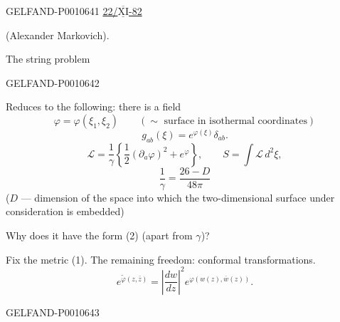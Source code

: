 \begin{GelfandAdjacentEvidence}{GELFAND-P001064}{1}
\underline{22/\(\overline{\underline{\mathrm{XI}}}\)-82 {}}\qquad
{}


(Alexander Markovich).

The string problem
\end{GelfandAdjacentEvidence}
\begin{GelfandAdjacentEvidence}{GELFAND-P001064}{2}


Reduces to the following: there is a field
\[
\varphi=\varphi(\xi_1,\xi_2)\qquad
  (\sim\text{ surface in isothermal coordinates})
\]
\begin{equation*}
g_{ab}(\xi)=e^{\varphi(\xi)}\delta_{ab}.
\tag{1}
\end{equation*}
\begin{equation*}
\mathcal L=\frac1\gamma\left\{\frac12(\partial_a\varphi)^2+e^\varphi\right\},
\qquad S=\int\mathcal L\,d^2\xi,
\tag{2}
\end{equation*}
\begin{equation*}
\frac1\gamma=\frac{26-D}{48\pi}
\tag{3}
\end{equation*}
(\(D\) — dimension of the space into which the two-dimensional surface under consideration is embedded)

Why does it have the form (2) (apart from \(\gamma\))?

Fix the metric (1). The remaining freedom: conformal transformations.
\begin{equation*}
e^{\widetilde\varphi(z,\bar z)}
=\left|\frac{dw}{dz}\right|^2 e^{\varphi(w(z),\overline w(z))}.
\tag{4}
\end{equation*}
\end{GelfandAdjacentEvidence}
\begin{GelfandAdjacentEvidence}{GELFAND-P001064}{3}

\end{GelfandAdjacentEvidence}
